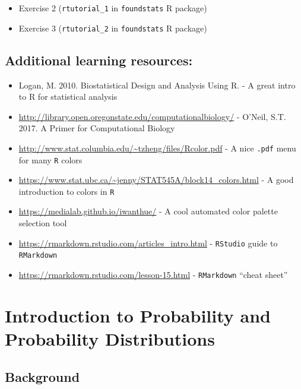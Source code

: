 \documentclass[]{book}
\providecommand{\tightlist}{%
  \setlength{\itemsep}{0pt}\setlength{\parskip}{0pt}}
\begin{document}
\begin{itemize}
\tightlist
\item
  Exercise 2 (\texttt{rtutorial\_1} in \texttt{foundstats} R package)
\item
  Exercise 3 (\texttt{rtutorial\_2} in \texttt{foundstats} R package)
\end{itemize}

\hypertarget{additional-learning-resources-2}{%
\section{Additional learning resources:}\label{additional-learning-resources-2}}

\begin{itemize}
\item
  Logan, M. 2010. Biostatistical Design and Analysis Using R. - A great intro to R for statistical analysis
\item
  \url{http://library.open.oregonstate.edu/computationalbiology/} - O'Neil, S.T. 2017. A Primer for Computational Biology
\item
  \url{http://www.stat.columbia.edu/~tzheng/files/Rcolor.pdf} - A nice \texttt{.pdf} menu for many \texttt{R} colors
\item
  \url{https://www.stat.ubc.ca/~jenny/STAT545A/block14_colors.html} - A good introduction to colors in \texttt{R}
\item
  \url{https://medialab.github.io/iwanthue/} - A cool automated color palette selection tool
\item
  \url{https://rmarkdown.rstudio.com/articles_intro.html} - \texttt{RStudio} guide to \texttt{RMarkdown}
\item
  \url{https://rmarkdown.rstudio.com/lesson-15.html} - \texttt{RMarkdown} ``cheat sheet''
\end{itemize}

\hypertarget{introduction-to-probability-and-probability-distributions}{%
\chapter{Introduction to Probability and Probability Distributions}\label{introduction-to-probability-and-probability-distributions}}

\hypertarget{background-2}{%
\section{Background}\label{background-2}}
\end{document}
